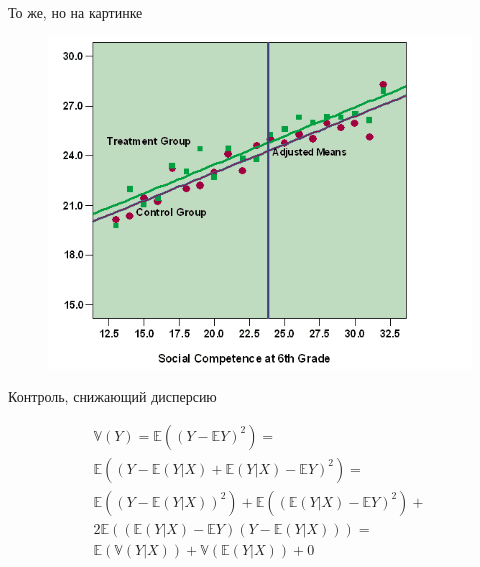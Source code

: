 \begin{frame}{То же, но на картинке}
\begin{figure}
    \centering
    \includegraphics[width=\textwidth]{Images/covariates.png}
\end{figure}
\end{frame}


\begin{frame}{Контроль, снижающий дисперсию}

\begin{gather*}
    \mathbb{V}(Y) = \mathbb{E}\left((Y - \mathbb{E}Y)^2\right) = \\
    \mathbb{E}\left(\left(Y - \mathbb{E}(Y|X) + \mathbb{E}(Y|X) - \mathbb{E}Y\right)^2\right) = \\
    \mathbb{E}\left((Y - \mathbb{E}(Y|X))^2\right) + \mathbb{E}\left((\mathbb{E}(Y|X) - \mathbb{E}Y)^2\right) +
    \\2\mathbb{E}\left(\left(\mathbb{E}(Y|X) - \mathbb{E}Y\right)\left(Y - \mathbb{E}(Y|X)\right)\right) = \\
    \mathbb{E}(\mathbb{V}(Y|X)) + \mathbb{V}(\mathbb{E}(Y|X)) + 0
\end{gather*} 
\end{frame}


